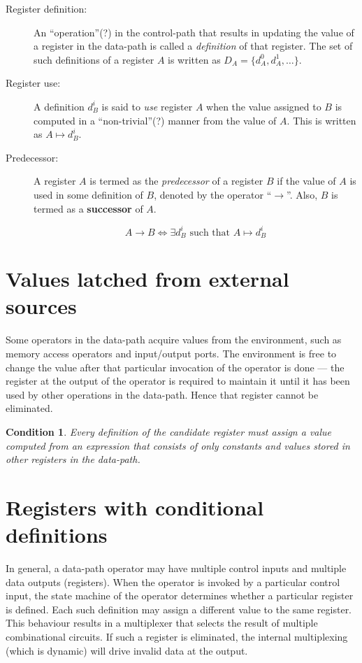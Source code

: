 \documentclass[a4paper,12pt]{article}
\newtheorem{condition}{Condition}
\begin{document}
\begin{description}
\item [Register definition:] An ``operation''(?) in the control-path
  that results in updating the value of a register in the data-path is
  called a \emph{definition} of that register. The set of such
  definitions of a register $A$ is written as $D_A =
  \{d^0_A,d^1_A,\ldots\}$.
\item [Register use:] A definition $d^i_B$ is said to \emph{use}
  register $A$ when the value assigned to $B$ is computed in a
  ``non-trivial''(?) manner from the value of $A$. This is written as
  $A\mapsto d^i_B$.
\item[Predecessor:] A register $A$ is termed as the \emph{predecessor}
  of a register $B$ if the value of $A$ is used in some definition of
  $B$, denoted by the operator ``$\longrightarrow$''. Also, $B$ is
  termed as a \textbf{successor} of $A$.
  
  \[A \longrightarrow B \iff \exists d^i_B \mbox{ such that } A\mapsto
  d^i_B\]
\end{description}

\section{Values latched from external sources}
\label{sec:external-data}

Some operators in the data-path acquire values from the environment,
such as memory access operators and input/output ports. The
environment is free to change the value after that particular
invocation of the operator is done --- the register at the output of
the operator is required to maintain it until it has been used by
other operations in the data-path. Hence that register cannot be
eliminated.

\begin{condition}
  \label{condition:external-data}
  Every definition of the candidate register must assign a value
  computed from an expression that consists of only constants and
  values stored in other registers in the data-path.
\end{condition}

\section{Registers with conditional definitions}
\label{sec:conditional-definitions}

In general, a data-path operator may have multiple control inputs and
multiple data outputs (registers). When the operator is invoked by a
particular control input, the state machine of the operator determines
whether a particular register is defined. Each such definition may
assign a different value to the same register. This behaviour results
in a multiplexer that selects the result of multiple combinational
circuits. If such a register is eliminated, the internal multiplexing
(which is dynamic) will drive invalid data at the output.
\end{document}
